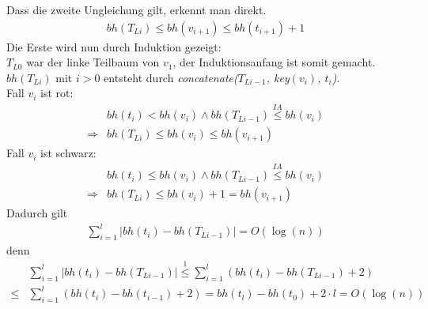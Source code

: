 \documentclass[a4paper,12pt]{article}
\begin{document}
\noindent Dass die zweite Ungleichung gilt, erkennt man direkt. 
\begin{align}
\mathit{bh}(T_{Li}) \leq \mathit{bh}(v_{i+1}) \leq\mathit{bh}(t_{i+1}) + 1  
\end{align}
Die Erste wird nun durch Induktion gezeigt:\\
$T_{L0}$ war der linke Teilbaum von $v_1$, der Induktionsanfang ist somit gemacht.\\
$\mathit{bh}(T_{Li})$ mit $i > 0$  entsteht durch \textit{concatenate($T_{Li-1}$, \textit{key}$\left(v_i\right)$, $t_i$)}.\\ 
Fall $v_i$ ist rot:
\begin{align*}
&\mathit{bh}(t_i) < \mathit{bh}(v_i)  \land  \mathit{bh}(T_{Li-1})  \overset{\textit{IA}}{\leq}  \mathit{bh}(v_{i}) \\
\Rightarrow  & \mathit{bh}(T_{Li})  \leq  \mathit{bh}(v_{i}) \leq  \mathit{bh}(v_{i+1}) 
\end{align*}
Fall $v_i$ ist schwarz:
\begin{align*}
&\mathit{bh}(t_i) \leq \mathit{bh}(v_i)  \land  \mathit{bh}(T_{Li-1})  \overset{\textit{IA}}{\leq}  \mathit{bh}(v_{i}) \\
\Rightarrow  &\mathit{bh}(T_{Li})  \leq \mathit{bh}(v_{i}) + 1 =    \mathit{bh}(v_{i+1})
\end{align*}
Dadurch gilt
\begin{align}
\sum_{i = 1}^{l} \vert\mathit{bh} \left(t_{i} \right) -\mathit{bh} \left(T_{Li-1} \right) \vert =  O \left(\log \left(n \right) \right)
\end{align}
denn
\begin{align*}
&\sum_{i = 1}^{l} \vert\mathit{bh} \left(t_{i} \right) -\mathit{bh} \left(T_{Li-1} \right) \vert \overset{\textit{1}}{\leq}
\sum_{i = 1}^{l} \left( \mathit{bh} \left(t_{i} \right) -\mathit{bh} \left(T_{Li-1} \right) + 2\right)\\
\leq &\sum_{i = 1}^{l} \left( \mathit{bh} \left(t_{i} \right) -\mathit{bh} \left(t_{i-1} \right) + 2\right)
=  \mathit{bh} \left(t_{l} \right) -\mathit{bh} \left(t_{0} \right) + 2 \cdot l  = O \left(\log \left(n \right) \right)
\end{align*}
\end{document}
